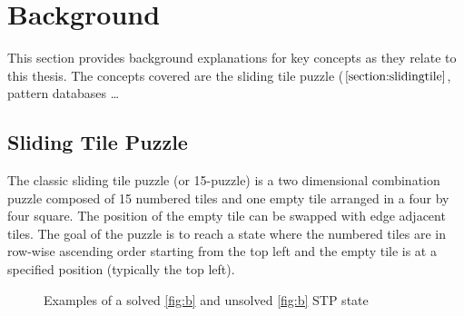 \chapter{Background}

This section provides background explanations for key concepts as they relate to this thesis. The concepts covered are the sliding tile 
puzzle ($\ref{section:slidingtile}$, pattern databases \dots

\section{Sliding Tile Puzzle} \label{section:slidingtile}

The classic sliding tile puzzle (or 15-puzzle) is a two dimensional combination puzzle composed of 15 numbered tiles and one empty tile arranged in a 
four by four square. The position of the empty tile can be swapped with edge adjacent tiles. The goal of the puzzle is to reach a state where the 
numbered tiles are in row-wise ascending order starting from the top left and the empty tile is at a specified position (typically the top left).

\begin{figure}
\centering
{}
\caption{Examples of a solved \ref{fig:b} and unsolved \ref{fig:b} STP state}
\end{figure}

